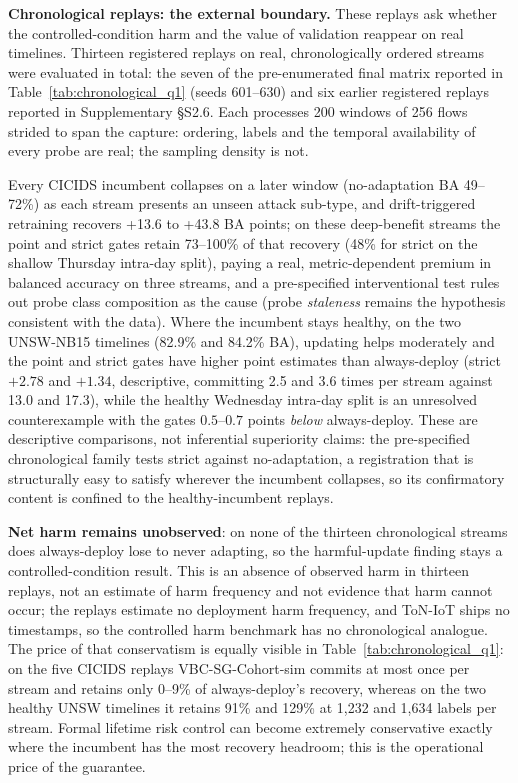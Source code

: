 \documentclass[a4paper,fleqn]{cas-sc}
\begin{document}
\textbf{Chronological replays: the external boundary.} These replays ask whether the controlled-condition harm and the value of validation reappear on real timelines. Thirteen registered replays on real, chronologically ordered streams were evaluated in total: the seven of the pre-enumerated final matrix reported in Table~\ref{tab:chronological_q1} (seeds 601--630) and six earlier registered replays reported in Supplementary \S S2.6. Each processes 200 windows of 256 flows strided to span the capture: ordering, labels and the temporal availability of every probe are real; the sampling density is not.

Every CICIDS incumbent collapses on a later window (no-adaptation BA 49--72\%) as each stream presents an unseen attack sub-type, and drift-triggered retraining recovers +13.6 to +43.8 BA points; on these deep-benefit streams the point and strict gates retain 73--100\% of that recovery (48\% for strict on the shallow Thursday intra-day split), paying a real, metric-dependent premium in balanced accuracy on three streams, and a pre-specified interventional test rules out probe class composition as the cause (probe \emph{staleness} remains the hypothesis consistent with the data). Where the incumbent stays healthy, on the two UNSW-NB15 timelines (82.9\% and 84.2\% BA), updating helps moderately and the point and strict gates have higher point estimates than always-deploy (strict $+2.78$ and $+1.34$, descriptive, committing 2.5 and 3.6 times per stream against 13.0 and 17.3), while the healthy Wednesday intra-day split is an unresolved counterexample with the gates $0.5$--$0.7$ points \emph{below} always-deploy. These are descriptive comparisons, not inferential superiority claims: the pre-specified chronological family tests strict against no-adaptation, a registration that is structurally easy to satisfy wherever the incumbent collapses, so its confirmatory content is confined to the healthy-incumbent replays.

\textbf{Net harm remains unobserved}: on none of the thirteen chronological streams does always-deploy lose to never adapting, so the harmful-update finding stays a controlled-condition result. This is an absence of observed harm in thirteen replays, not an estimate of harm frequency and not evidence that harm cannot occur; the replays estimate no deployment harm frequency, and ToN-IoT ships no timestamps, so the controlled harm benchmark has no chronological analogue. The price of that conservatism is equally visible in Table~\ref{tab:chronological_q1}: on the five CICIDS replays VBC-SG-Cohort-sim commits at most once per stream and retains only 0--9\% of always-deploy's recovery, whereas on the two healthy UNSW timelines it retains 91\% and 129\% at 1{,}232 and 1{,}634 labels per stream. Formal lifetime risk control can become extremely conservative exactly where the incumbent has the most recovery headroom; this is the operational price of the guarantee.
\end{document}
